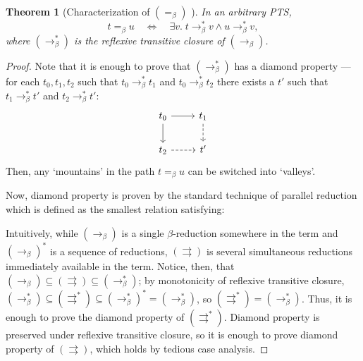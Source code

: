 \documentclass{article}
\newtheorem{theorem}{Theorem}
\theoremstyle{definition}
\theoremstyle{remark}
\begin{document}
\begin{theorem}[Characterization of $(=_\beta)$
    ]
    In an arbitrary PTS,
    \[
        t =_\beta u \quad\Leftrightarrow\quad
        \exists v.\;t\to_\beta^* v
        \land u\to_\beta^* v,
    \]
    where $(\to_\beta^*)$ is the reflexive transitive
    closure of $(\to_\beta)$.
\end{theorem}
\begin{proof}
    Note that it is enough to prove that
    $(\to_\beta^*)$ has a diamond property --- for each
    $t_0,t_1,t_2$ such that $t_0\to_\beta^* t_1$ and
    $t_0\to_\beta^* t_2$ there exists a $t'$ such that
    $t_1\to_\beta^* t'$ and $t_2\to_\beta^* t'$:
    \[\begin{tikzcd}
        t_0 \arrow[r] \arrow[d]
        & t_1 \arrow[d, dashed] \\
        t_2 \arrow[r, dashed] & t'
    \end{tikzcd}\]
    Then, any `mountains' in the path $t=_\beta u$
    can be switched into `valleys'.

    Now, diamond property is proven by the standard
    technique of parallel reduction
    \cite{martinlof1971theory} which is defined as the
    smallest relation satisfying:
    Intuitively, while $(\to_\beta)$ is a single
    $\beta$-reduction somewhere in the term and
    $(\to_\beta)^*$ is a sequence of reductions,
    $(\rightrightarrows)$ is several simultaneous
    reductions immediately available in the term.
    Notice, then, that $(\to_\beta)\subseteq
    (\rightrightarrows)\subseteq(\to_\beta^*)$; by
    monotonicity of reflexive transitive closure,
    $(\to_\beta^*)\subseteq
    (\rightrightarrows^*)\subseteq(\to_\beta^*)^*
    =(\to_\beta^*)$, so
    $(\rightrightarrows^*)=(\to_\beta^*)$. Thus, it is
    enough to prove the diamond property of
    $(\rightrightarrows^*)$. Diamond property is
    preserved under reflexive transitive closure, so it
    is enough to prove diamond property of
    $(\rightrightarrows)$, which holds by tedious case
    analysis.
\end{proof}
\end{document}
